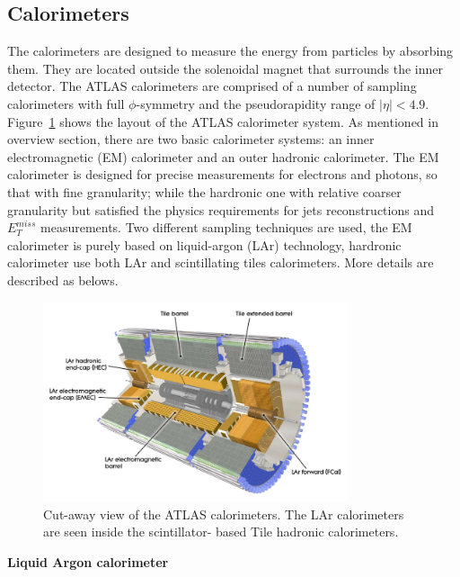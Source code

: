 \subsection{Calorimeters}

The calorimeters are designed to measure the energy from particles by absorbing them.
They are located outside the solenoidal magnet that surrounds the inner detector.
The ATLAS calorimeters are comprised of a number of sampling calorimeters with full $\phi$-symmetry and the pseudorapidity range of $|\eta|<4.9$.
Figure~\ref{fig:calo_dec} shows the layout of the ATLAS calorimeter system.
As mentioned in overview section, there are two basic calorimeter systems: an inner electromagnetic (EM) calorimeter and an outer hadronic calorimeter.
The EM calorimeter is designed for precise measurements for electrons and photons, so that with fine granularity;
while the hardronic one with relative coarser granularity but satisfied the physics requirements for jets reconstructions and $E_{T}^{miss}$ measurements.
Two different sampling techniques are used, the EM calorimeter is purely based on liquid-argon (LAr) technology, hardronic calorimeter use both LAr and scintillating tiles calorimeters. 
More details are described as belows.
\begin{figure}[!htb]
  \centering
  \includegraphics[width=0.8\textwidth]{figures/Detector/calo_layout.png}
  \caption{Cut-away view of the ATLAS calorimeters. The LAr calorimeters are seen inside the scintillator- based Tile hadronic calorimeters\cite{Buchanan:2008}.}
  \label{fig:calo_dec}
\end{figure}

\textbf{Liquid Argon calorimeter}

